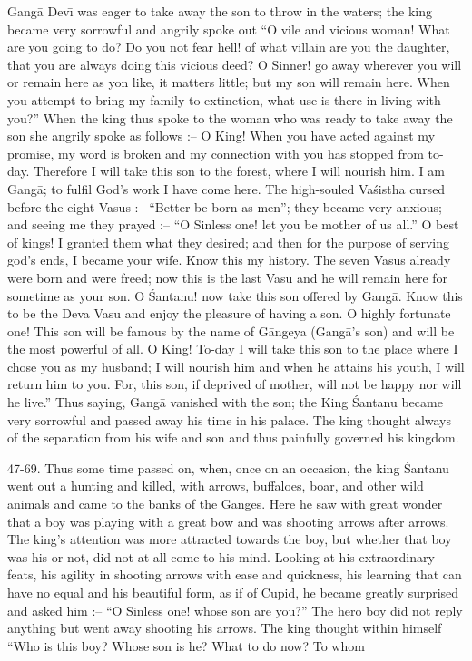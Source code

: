 Gang\=a Dev\={\i} was eager to take away the son to throw in the waters; the king became very sorrowful and angrily spoke out ``O vile and vicious woman! What are you going to do? Do you not fear hell! of what villain are you the daughter, that you are always doing this vicious deed? O Sinner! go away wherever you will or remain here as yon like, it matters little; but my son will remain here. When you attempt to bring my family to extinction, what use is there in living with you?'' When the king thus spoke to the woman who was ready to take away the son she angrily spoke as follows :-- O King! When you have acted against my promise, my word is broken and my connection with you has stopped from to-day. Therefore I will take this son to the forest, where I will nourish him. I am Gang\=a; to fulfil God's work I have come here. The high-souled Va\'sistha cursed before the eight Vasus :-- ``Better be born as men''; they became very anxious; and seeing me they prayed :-- ``O Sinless one! let you be mother of us all.'' O best of kings! I granted them what they desired; and then for the purpose of serving god's ends, I became your wife. Know this my history. The seven Vasus already were born and were freed; now this is the last Vasu and he will remain here for sometime as your son. O \'Santanu! now take this son offered by Gang\=a. Know this to be the Deva Vasu and enjoy the pleasure of having a son. O highly fortunate one! This son will be famous by the name of G\=angeya (Gang\=a's son) and will be the most powerful of all. O King! To-day I will take this son to the place where I chose you as my husband; I will nourish him and when he attains his youth, I will return him to you. For, this son, if deprived of mother, will not be happy nor will he live.'' Thus saying, Gang\=a vanished with the son; the King \'Santanu became very sorrowful and passed away his time in his palace. The king thought always of the separation from his wife and son and thus painfully governed his kingdom.

47-69. Thus some time passed on, when, once on an occasion, the king \'Santanu went out a hunting and killed, with arrows, buffaloes, boar, and other wild animals and came to the banks of the Ganges. Here he saw with great wonder that a boy was playing with a great bow and was shooting arrows after arrows. The king's attention was more attracted towards the boy, but whether that boy was his or not, did not at all come to his mind. Looking at his extraordinary feats, his agility in shooting arrows with ease and quickness, his learning that can have no equal and his beautiful form, as if of Cupid, he became greatly surprised and asked him :-- ``O Sinless one! whose son are you?'' The hero boy did not reply anything but went away shooting his arrows. The king thought within himself ``Who is this boy? Whose son is he? What to do now? To whom

